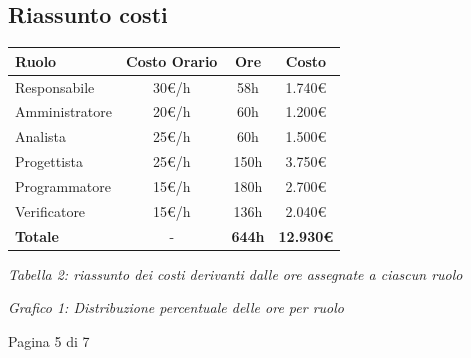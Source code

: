 \documentclass[a4paper,11pt]{article}
\begin{document}
\newpage

\subsection{Riassunto costi}

{\footnotesize
\begin{center}
\begin{tabular}{|l|c|c|c|}
\hline
\textbf{Ruolo} & \textbf{Costo Orario} & \textbf{Ore} & \textbf{Costo} \\
\hline
Responsabile & 30€/h & 58h & 1.740€ \\
Amministratore & 20€/h & 60h & 1.200€ \\
Analista & 25€/h & 60h & 1.500€ \\
Progettista & 25€/h & 150h & 3.750€ \\
Programmatore & 15€/h & 180h & 2.700€ \\
Verificatore & 15€/h & 136h & 2.040€ \\
\hline
\textbf{Totale} & - & \textbf{644h} & \textbf{12.930€} \\
\hline
\end{tabular}
\end{center}
}

\begin{center}
\textit{Tabella 2: riassunto dei costi derivanti dalle ore assegnate a ciascun ruolo}
\end{center}

\vspace{1cm}

\begin{center}
\end{center}

\begin{center}
\textit{Grafico 1: Distribuzione percentuale delle ore per ruolo}
\end{center}

\vfill
\begin{center}
Pagina 5 di 7
\end{center}
\end{document}

